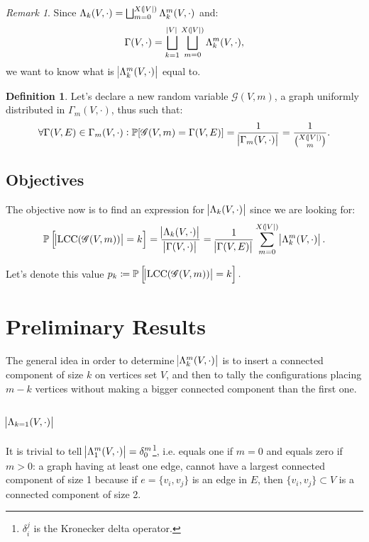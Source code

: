\documentclass{article}
\theoremstyle{definition}
\newtheorem{definition}[lemma]{Definition}
\theoremstyle{remark}
\newtheorem*{remark}{Remark}
\DeclareMathOperator{\LCC}{LCC}
\renewcommand{\P}{\mathbb P}
\begin{document}
		\begin{remark} Since $\Lambda_k(V, \cdot) = \bigsqcup_{m=0}^{X(\abs V)}\Lambda_k^m(V, \cdot)$ and:
		\[\Gamma(V, \cdot) = \bigsqcup_{k=1}^{\abs V}\bigsqcup_{m=0}^{X(\abs V)}\Lambda_k^m(V, \cdot),\]
		we want to know what is $\abs {\Lambda_k^m(V, \cdot)}$ equal to.
		\end{remark}

		\begin{definition} Let's declare a new random variable $\mathscr G(V, m)$, a graph uniformly distributed in $\Gamma_m(V, \cdot)$, thus such that:
		\[\forall \Gamma(V, E) \in \Gamma_m(V, \cdot) : \P[\mathscr G(V, m) = \Gamma(V, E)] = \frac 1{\abs {\Gamma_m(V, \cdot)}} = \frac 1{\binom {X(\abs V)}m}.\]
		\end{definition}

	\subsection{Objectives}
		The objective now is to find an expression for $\abs {\Lambda_k(V, \cdot)}$ since we are looking for:
		\[\P\left[\abs {\LCC(\mathscr G(V, m))} = k\right] = \frac {\abs {\Lambda_k(V, \cdot)}}{\abs {\Gamma(V, \cdot)}}
			= \frac 1{\abs {\Gamma(V, E)}}\sum_{m=0}^{X(\abs V)}\abs {\Lambda_k^m(V, \cdot)}.\]

		Let's denote this value $p_k \coloneqq \P\left[\abs {\LCC(\mathscr G(V, m))} = k\right].$

\section{Preliminary Results}\label{sec:results}
	The general idea in order to determine $\abs {\Lambda_k^m(V, \cdot)}$ is to insert a connected component of size $k$ on vertices set $V$, and then to tally the configurations
	placing $m-k$ vertices without making a bigger connected component than the first one.

	\subsection{$\abs {\Lambda_{k=1}(V, \cdot)}$}
		It is trivial to tell $\abs {\Lambda_1^m(V, \cdot)} = \delta_0^m$\footnote{$\delta_i^j$ is the Kronecker delta operator.}, i.e. equals one if $m=0$ and equals zero
		if $m>0$: a graph having at least one edge, cannot have a largest connected component of size 1 because if $e = \{v_i, v_j\}$ is an edge in $E$, then
		$\{v_i, v_j\} \subset V$ is a connected component of size 2.
\end{document}
